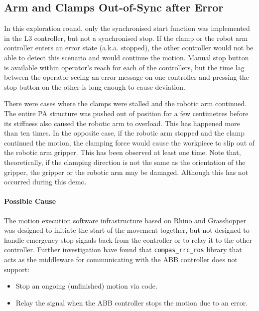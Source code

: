 \subsection{Arm and Clamps Out-of-Sync after Error}
\label{subsection:exploration-2-arm-and-clamps-out-of-sync-after-error}

In this exploration round, only the synchronised start function was implemented in the L3 controller, but not a synchronised stop. If the clamp or the robot arm controller enters an error state (a.k.a. stopped), the other controller would not be able to detect this scenario and would continue the motion. Manual stop button is available within operator’s reach for each of the controllers, but the time lag between the operator seeing an error message on one controller and pressing the stop button on the other is long enough to cause deviation.

There were cases where the clamps were stalled and the robotic arm continued. The entire PA structure was pushed out of position for a few centimetres before its stiffness also caused the robotic arm to overload. This has happened more than ten times.
In the opposite case, if the robotic arm stopped and the clamp continued the motion, the clamping force would cause the workpiece to slip out of the robotic arm gripper. This has been observed at least one time.
Note that, theoretically, if the clamping direction is not the same as the orientation of the gripper, the gripper or the robotic arm may be damaged. Although this has not occurred during this demo.

\paragraph{Possible Cause}

The motion execution software infrastructure based on Rhino and Grasshopper was designed to initiate the start of the movement together, but not designed to handle emergency stop signals back from the controller or to relay it to the other controller.
Further investigation have found that \verb|compas_rrc_ros| library that acts as the middleware for communicating with the ABB controller does not support:
\begin{itemize}
    \item Stop an ongoing (unfinished) motion via code.
    \item Relay the signal when the ABB controller stops the motion due to an error. 
\end{itemize}

